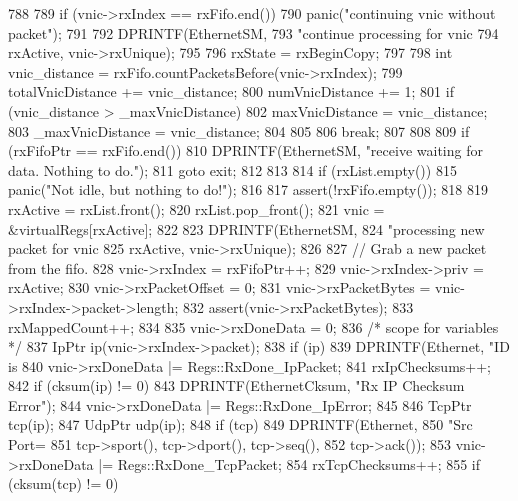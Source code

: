 \begin{DoxyCode}
{{{788 
789             if (vnic->rxIndex == rxFifo.end())
790                 panic("continuing vnic without packet\n");
791 
792             DPRINTF(EthernetSM,
793                     "continue processing for vnic %
794                     rxActive, vnic->rxUnique);
795 
796             rxState = rxBeginCopy;
797 
798             int vnic_distance = rxFifo.countPacketsBefore(vnic->rxIndex);
799             totalVnicDistance += vnic_distance;
800             numVnicDistance += 1;
801             if (vnic_distance > _maxVnicDistance) {
802                 maxVnicDistance = vnic_distance;
803                 _maxVnicDistance = vnic_distance;
804             }
805 
806             break;
807         }
808 
809         if (rxFifoPtr == rxFifo.end()) {
810             DPRINTF(EthernetSM, "receive waiting for data.  Nothing to do.\n");
811             goto exit;
812         }
813 
814         if (rxList.empty())
815             panic("Not idle, but nothing to do!");
816 
817         assert(!rxFifo.empty());
818 
819         rxActive = rxList.front();
820         rxList.pop_front();
821         vnic = &virtualRegs[rxActive];
822 
823         DPRINTF(EthernetSM,
824                 "processing new packet for vnic %
825                 rxActive, vnic->rxUnique);
826 
827         // Grab a new packet from the fifo.
828         vnic->rxIndex = rxFifoPtr++;
829         vnic->rxIndex->priv = rxActive;
830         vnic->rxPacketOffset = 0;
831         vnic->rxPacketBytes = vnic->rxIndex->packet->length;
832         assert(vnic->rxPacketBytes);
833         rxMappedCount++;
834 
835         vnic->rxDoneData = 0;
836         /* scope for variables */ {
837             IpPtr ip(vnic->rxIndex->packet);
838             if (ip) {
839                 DPRINTF(Ethernet, "ID is %
840                 vnic->rxDoneData |= Regs::RxDone_IpPacket;
841                 rxIpChecksums++;
842                 if (cksum(ip) != 0) {
843                     DPRINTF(EthernetCksum, "Rx IP Checksum Error\n");
844                     vnic->rxDoneData |= Regs::RxDone_IpError;
845                 }
846                 TcpPtr tcp(ip);
847                 UdpPtr udp(ip);
848                 if (tcp) {
849                     DPRINTF(Ethernet,
850                             "Src Port=%
851                             tcp->sport(), tcp->dport(), tcp->seq(),
852                             tcp->ack());
853                     vnic->rxDoneData |= Regs::RxDone_TcpPacket;
854                     rxTcpChecksums++;
855                     if (cksum(tcp) != 0) {
}}}}}}
\end{DoxyCode}
